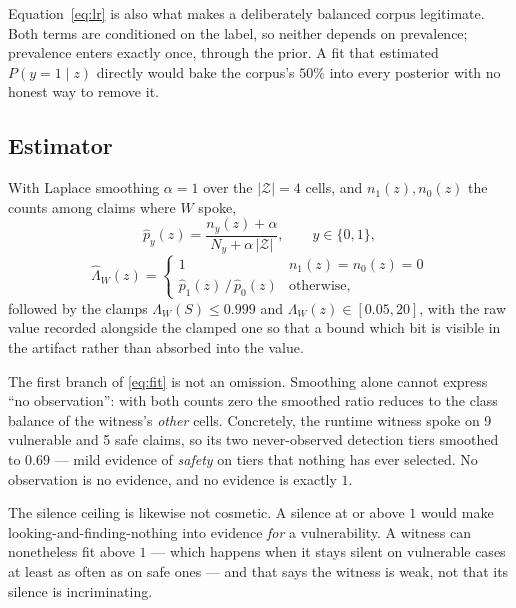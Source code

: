 \documentclass[conference]{IEEEtran}
\newcommand{\Cells}{\mathcal{Z}}
\newcommand{\LR}{\Lambda}
\begin{document}
Equation~\eqref{eq:lr} is also what makes a deliberately balanced corpus legitimate. Both
terms are conditioned on the label, so neither depends on prevalence; prevalence enters
exactly once, through the prior. A fit that estimated $P(y=1 \mid z)$ directly would bake the
corpus's $50\%$ into every posterior with no honest way to remove it.

\subsection{Estimator}
With Laplace smoothing $\alpha=1$ over the $|\Cells|=4$ cells, and $n_1(z), n_0(z)$ the counts
among claims where $W$ spoke,
\begin{equation}
\hat{p}_y(z) = \frac{n_y(z) + \alpha}{N_y + \alpha\,|\Cells|}, \qquad y \in \{0,1\},
\end{equation}
\begin{equation}
\hat{\LR}_W(z) =
\begin{cases}
1 & n_1(z)=n_0(z)=0\\[3pt]
\hat{p}_1(z)\,/\,\hat{p}_0(z) & \text{otherwise,}
\end{cases}
\label{eq:fit}
\end{equation}
followed by the clamps $\LR_W(S) \le 0.999$ and $\LR_W(z) \in [0.05, 20]$, with the raw value
recorded alongside the clamped one so that a bound which bit is visible in the artifact rather
than absorbed into the value.

The first branch of \eqref{eq:fit} is not an omission. Smoothing alone cannot express ``no
observation'': with both counts zero the smoothed ratio reduces to the class balance of the
witness's \emph{other} cells. Concretely, the runtime witness spoke on 9 vulnerable and 5 safe
claims, so its two never-observed detection tiers smoothed to $0.69$ --- mild evidence of
\emph{safety} on tiers that nothing has ever selected. No observation is no evidence, and no
evidence is exactly $1$.

The silence ceiling is likewise not cosmetic. A silence at or above $1$ would make
looking-and-finding-nothing into evidence \emph{for} a vulnerability. A witness can
nonetheless fit above $1$ --- which happens when it stays silent on vulnerable cases at least
as often as on safe ones --- and that says the witness is weak, not that its silence is
incriminating.
\end{document}
